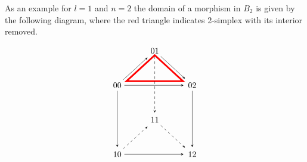 As an example for $l=1$ and $n=2$ the domain of a morphism in $B_2$ is given by the following diagram, where the red triangle indicates 2-simplex with its interior removed.
\[
\begin{tikzpicture}[>=stealth,->,shorten >=2pt,looseness=.5,auto]
            \matrix[anchor=center, column sep=1cm, row sep=1cm] at (0,0)
            {
                                & \node(01) {$01$};   &                 \\
             \node(00) {$00$};     &                  & \node(02) {$02$}; \\
                                & \node(11) {$11$};   &                  \\
            \node(10) {$10$};    &                     & \node(12) {$12$}; \\ 
            };
            \draw[line width=2pt,color=red] (-1.2,0.9) -- (1.2,0.9) -- (0, 2) -- cycle;
            \begin{scope}[every node/.style={font=\small\itshape}]
                \draw (00) --  (01);
                \draw (00) --  (02);
                \draw (01) --  (02);
                \draw (00) --  (10);
                \draw [dashed] (01) --  (11);
                \draw (02) --  (12);
                \draw [dashed]  (10) --  (11);
                \draw   (10) --  (12);
                \draw [dashed]   (11) -- (12);
            \end{scope}
    \end{tikzpicture}
\]

